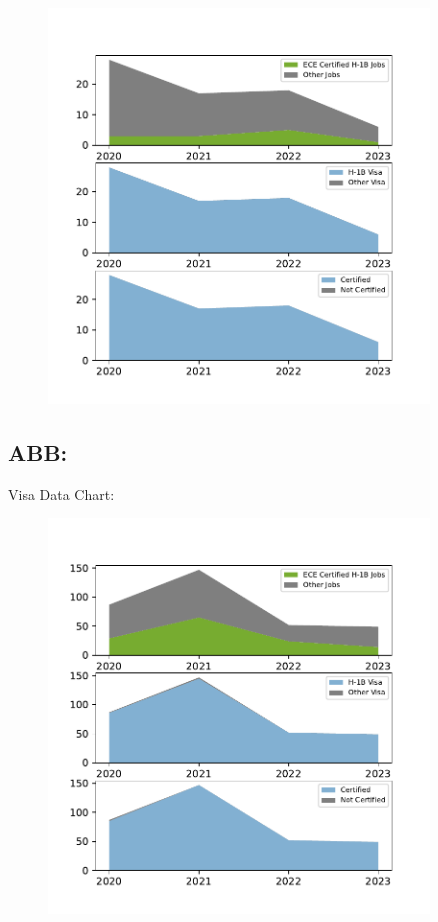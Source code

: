 \documentclass{article}%
\begin{document}
\begin{figure}[htbp]%
\centering%
\includegraphics[width=0.9\textwidth]{./temp_img/A123SYSTEMS_detailed.pdf}%
\end{figure}

%
\newpage%
\subsection{ABB:}%
\label{subsec:ABB}%
Visa Data Chart:%


\begin{figure}[htbp]%
\centering%
\includegraphics[width=0.9\textwidth]{./temp_img/ABB_detailed.pdf}%
\end{figure}
\end{document}
